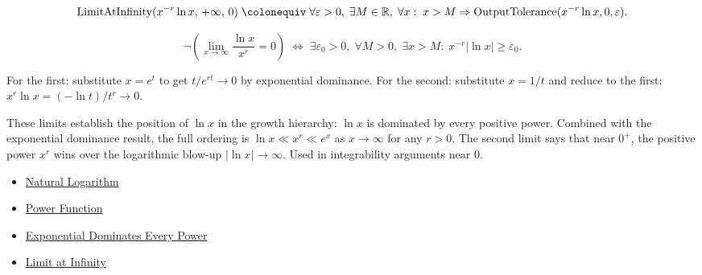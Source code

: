 \begin{remark*}
\[
  \operatorname{LimitAtInfinity}(x^{-r}\ln x,\,+\infty,\,0)
  \;\colonequiv\;
  \forall\varepsilon>0,\;\exists M\in\mathbb{R},\;\forall x:\;
  x>M \Rightarrow \operatorname{OutputTolerance}(x^{-r}\ln x,0,\varepsilon).
\]
\end{remark*}

\begin{remark*}
\[
  \neg\left(\lim_{x\to\infty}\frac{\ln x}{x^r}=0\right)
  \;\iff\;
  \exists\varepsilon_0>0,\;\forall M>0,\;\exists x>M:\;
  x^{-r}|\ln x|\geq\varepsilon_0.
\]
\end{remark*}

\begin{remark*}
For the first: substitute $x = e^t$ to get $t/e^{rt} \to 0$ by
exponential dominance. For the second: substitute $x = 1/t$ and
reduce to the first: $x^r \ln x = (-\ln t)/t^r \to 0$.
\end{remark*}

\begin{remark*}[Significance]
These limits establish the position of $\ln x$ in the growth
hierarchy: $\ln x$ is dominated by every positive power. Combined
with the exponential dominance result, the full ordering is
$\ln x \ll x^r \ll e^x$ as $x \to \infty$ for any $r > 0$.
The second limit says that near $0^+$, the positive power $x^r$
wins over the logarithmic blow-up $|\ln x| \to \infty$. Used in
integrability arguments near $0$.
\end{remark*}

\begin{dependencies}
\begin{itemize}
  \item \hyperref[def:natural-logarithm]{Natural Logarithm}
  \item \hyperref[def:power-function]{Power Function}
  \item \hyperref[prop:exponential-dominates-power]{Exponential Dominates Every Power}
  \item \hyperref[def:limit-at-infinity]{Limit at Infinity}
\end{itemize}
\end{dependencies}
